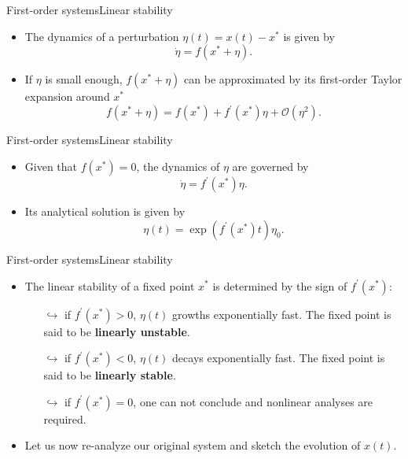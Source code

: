 \documentclass[usenames,dvipsnames,svgnames,10pt,aspectratio=169]{beamer}
\begin{document}
\begin{frame}[t, c]{First-order systems}{Linear stability}
	\begin{itemize}
		\item The dynamics of a perturbation $\eta(t) = x(t) - x^*$ is given by
		$$
		\dot{\eta} = f(x^* + \eta).
		$$

		\bigskip

		\item If $\eta$ is small enough, $f(x^* + \eta)$ can be approximated by its first-order Taylor expansion around $x^*$
		$$
		f(x^* + \eta) = f(x^*) + f^{\prime}(x^*) \eta + \mathcal{O}(\eta^2).
		$$
	\end{itemize}

	\vspace{1cm}
\end{frame}

\begin{frame}[t, c]{First-order systems}{Linear stability}
	\begin{itemize}
		\item Given that $f(x^*) = 0$, the dynamics of $\eta$ are governed by
		$$
		\dot{\eta} = f^{\prime}(x^*) \eta.
		$$

		\bigskip

		\item Its analytical solution is given by
		$$
		\eta(t) = \exp \left( f^{\prime}(x^*) t \right) \eta_0.
		$$
	\end{itemize}

	\vspace{1cm}
\end{frame}

\begin{frame}[t, c]{First-order systems}{Linear stability}
	\begin{itemize}
		\item The linear stability of a fixed point $x^*$ is determined by the sign of $f^{\prime}(x^*)$:

		\begin{itemize}
			\item[$\hookrightarrow$] if $f^{\prime}(x^*) > 0$, $\eta(t)$ growths exponentially fast. The fixed point is said to be \alert{\textbf{linearly unstable}}.

			\medskip

			\item[$\hookrightarrow$] if $f^{\prime}(x^*) < 0$, $\eta(t)$ decays exponentially fast. The fixed point is said to be \alert{\textbf{linearly stable}}.

			\medskip

			\item[$\hookrightarrow$] if $f^{\prime}(x^*) = 0$, one can not conclude and nonlinear analyses are required.
		\end{itemize}

		\bigskip

		\item Let us now re-analyze our original system and sketch the evolution of $x(t)$.
	\end{itemize}

	\vspace{1cm}
\end{frame}
\end{document}
